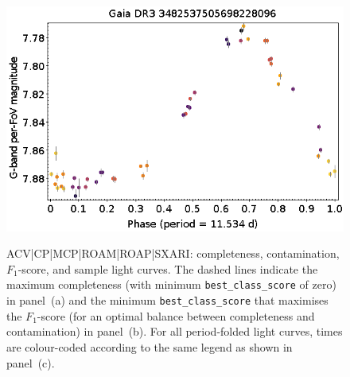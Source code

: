 \documentclass[longauth]{aa}
\begin{document}
\begin{appendix}
\begin{figure}
\hspace{2mm}
 \includegraphics[width=0.45\hsize]{figures/appendix/ACV-60.png} \\
\vspace{4mm}
 \caption{ACV|CP|MCP|ROAM|ROAP|SXARI: completeness, contamination, $F_1$-score, and sample light curves. The dashed lines indicate the maximum completeness (with minimum \texttt{best\_class\_score} of zero) in panel~(a) and the minimum \texttt{best\_class\_score} that maximises the $F_1$-score (for an optimal balance between completeness and contamination) in panel~(b). For all period-folded light curves, times are colour-coded according to the same legend as shown in panel~(c).}
 \label{fig:app:ACV_cc}
\end{figure}




\end{appendix}
\end{document}
